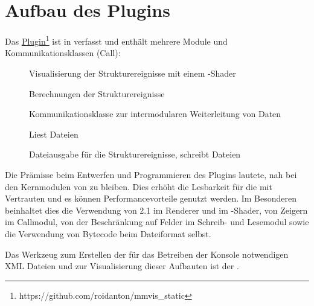 \section{Aufbau des Plugins}\label{sec:pluginaufbau}
Das \href{https://github.com/roidanton/mmvis_static}{Plugin}\footnote{https://github.com/roidanton/mmvis\_static} ist in  verfasst und enthält mehrere Module und Kommunikationsklassen (Call):
\begin{description}
	\item [] Visualisierung der Strukturereignisse mit einem -Shader
	\item [] Berechnungen der Strukturereignisse
	\item [] Kommunikationsklasse zur intermodularen Weiterleitung von Daten
	\item [] Liest \MMSE Dateien
	\item [] Dateiausgabe für die Strukturereignisse, schreibt \MMSE Dateien
\end{description}

Die Prämisse beim Entwerfen und Programmieren des Plugins lautete, nah bei den Kernmodulen von  zu bleiben. Dies erhöht die Lesbarkeit für die mit  Vertrauten und es können Performancevorteile genutzt werden. Im Besonderen beinhaltet dies die Verwendung von  2.1 im Renderer und im -Shader, von Zeigern im Callmodul, von der Beschränkung auf Felder im Schreib- und Lesemodul sowie die Verwendung von Bytecode beim Dateiformat selbst.

Das Werkzeug zum Erstellen der für das Betreiben der  Konsole notwendigen \gls{XML} Dateien und zur Visualisierung dieser Aufbauten ist der .

